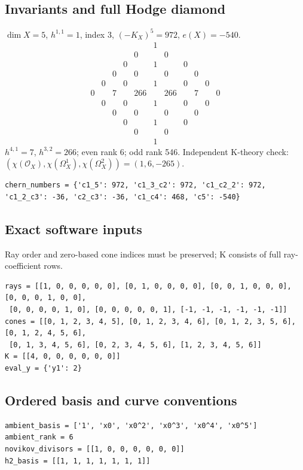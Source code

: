 \documentclass[10pt,a4paper]{article}
\begin{document}
\subsection*{Invariants and full Hodge diamond}
$\dim X=5$, $h^{1,1}=1$, index $3$, $(-K_X)^5=972$, $e(X)=-540$.
\[\begin{array}{ccccccccccc}&&&&&1&&&&&\\&&&&0&&0&&&&\\&&&0&&1&&0&&&\\&&0&&0&&0&&0&&\\&0&&0&&1&&0&&0&\\0&&7&&266&&266&&7&&0\\&0&&0&&1&&0&&0&\\&&0&&0&&0&&0&&\\&&&0&&1&&0&&&\\&&&&0&&0&&&&\\&&&&&1&&&&&\end{array}\]
$h^{4,1}=7$, $h^{3,2}=266$; even rank 6; odd rank 546.
Independent K-theory check: $(\chi(\mathcal O_X),\chi(\Omega_X^1),\chi(\Omega_X^2))=(1, 6, -265)$.
\begin{lstlisting}
chern_numbers = {'c1_5': 972, 'c1_3_c2': 972, 'c1_c2_2': 972, 'c1_2_c3': -36, 'c2_c3': -36, 'c1_c4': 468, 'c5': -540}
\end{lstlisting}
\subsection*{Exact software inputs}
Ray order and zero-based cone indices must be preserved; K consists of full ray-coefficient rows.
\begin{lstlisting}
rays = [[1, 0, 0, 0, 0, 0], [0, 1, 0, 0, 0, 0], [0, 0, 1, 0, 0, 0], [0, 0, 0, 1, 0, 0],
 [0, 0, 0, 0, 1, 0], [0, 0, 0, 0, 0, 1], [-1, -1, -1, -1, -1, -1]]
cones = [[0, 1, 2, 3, 4, 5], [0, 1, 2, 3, 4, 6], [0, 1, 2, 3, 5, 6], [0, 1, 2, 4, 5, 6],
 [0, 1, 3, 4, 5, 6], [0, 2, 3, 4, 5, 6], [1, 2, 3, 4, 5, 6]]
K = [[4, 0, 0, 0, 0, 0, 0]]
eval_y = {'y1': 2}
\end{lstlisting}
\subsection*{Ordered basis and curve conventions}
\begin{lstlisting}
ambient_basis = ['1', 'x0', 'x0^2', 'x0^3', 'x0^4', 'x0^5']
ambient_rank = 6
novikov_divisors = [[1, 0, 0, 0, 0, 0, 0]]
h2_basis = [[1, 1, 1, 1, 1, 1, 1]]
\end{lstlisting}
\end{document}
